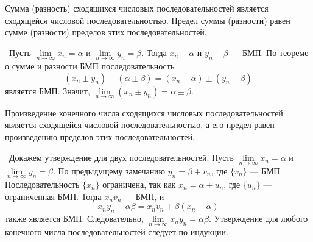 
\begin{theorem}
    Сумма (разность) сходящихся числовых последовательностей является
    сходящейся числовой последовательностью. Предел суммы (разности)
    равен сумме (разности) пределов этих последовательностей.

    \vspace{2mm}

    \proofname~Пусть \(\lim\limits_{n\to\infty}x_{n}=\alpha\) и
    \(\lim\limits_{n\to\infty}y_{n}=\beta\). Тогда
    \(x_{n}-\alpha\) и \(y_{n}-\beta\) --- БМП. По теореме о сумме
    и разности БМП последовательность
    \[(x_{n}\pm y_{n})-(\alpha\pm\beta)=
    (x_{n}-\alpha)\pm(y_{n}-\beta)\]
    является БМП. Значит,
    \(\lim\limits_{n\to\infty}(x_{n}\pm y_{n})=\alpha\pm\beta\).
    ~\qedsymbol
\end{theorem}

\begin{theorem}
    Произведение конечного числа сходящихся числовых последовательностей
    является сходящейся числовой последовательностью, а его предел
    равен произведению пределов этих последовательностей.

    \vspace{2mm}

    \proofname~Докажем утверждение для двух последовательностей.
    Пусть \(\lim\limits_{n\to\infty}x_{n}=\alpha\) и
    \(\lim\limits_{n\to\infty}y_{n}=\beta\). По предыдущему
    замечанию \(y_{n}=\beta+v_{n}\), где \(\{v_{n}\}\) --- БМП.
    Последовательность \(\{x_{n}\}\) ограничена, так как
    \(x_{n}=\alpha+u_{n}\), где \(\{u_{n}\}\) --- ограниченная БМП.
    Тогда \(x_{n}v_{n}\) --- БМП, и
    \[x_{n}y_{n}-\alpha\beta=x_{n}v_{n}+\beta(x_{n}-\alpha)\]
    также является БМП. Следовательно,
    \(\lim\limits_{n\to\infty}x_{n}y_{n}=\alpha\beta\).
    Утверждение для любого конечного числа последовательностей следует
    по индукции.~\qedsymbol
\end{theorem}

